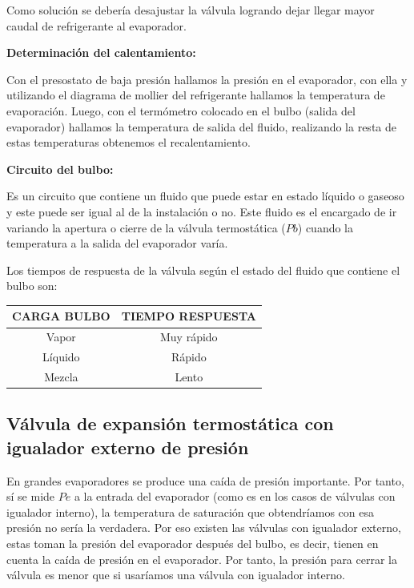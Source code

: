 Como soluci\'on se deber\'ia desajustar la v\'alvula logrando dejar llegar mayor caudal de refrigerante al evaporador.

\textbf{Determinaci\'on del calentamiento:}

Con el presostato de baja presi\'on hallamos la presi\'on en el evaporador, con ella y utilizando el diagrama de mollier del refrigerante hallamos la temperatura de evaporaci\'on. Luego, con el term\'ometro colocado en el bulbo (salida del evaporador) hallamos la temperatura de salida del fluido, realizando la resta de estas temperaturas obtenemos el recalentamiento. 

\textbf{Circuito del bulbo:}

Es un circuito que contiene un fluido que puede estar en estado l\'iquido o gaseoso y este puede ser igual al de la instalaci\'on o no. Este fluido es el encargado de ir variando la apertura o cierre de la v\'alvula termost\'atica ($Pb$) cuando la temperatura a la salida del evaporador var\'ia. 

Los tiempos de respuesta de la v\'alvula seg\'un el estado del fluido que contiene el bulbo son:

\begin{table}[H]
    \centering
    \begin{tabular}{c c}\hline
    CARGA BULBO & TIEMPO RESPUESTA\\ \hline
    Vapor & Muy r\'apido\\
    L\'iquido & R\'apido\\
    Mezcla & Lento\\ \hline    
    \end{tabular}
\end{table}

\subsection{V\'alvula de expansi\'on termost\'atica con igualador externo de presi\'on}

En grandes evaporadores se produce una ca\'ida de presi\'on importante. Por tanto, s\'i se mide $Pe$ a la entrada del evaporador (como es en los casos de v\'alvulas con igualador interno), la temperatura de saturaci\'on que obtendr\'iamos con esa presi\'on no ser\'ia la verdadera. Por eso existen las v\'alvulas con igualador externo, estas toman la presi\'on del evaporador despu\'es del bulbo, es decir, tienen en cuenta la ca\'ida de presi\'on en el evaporador. Por tanto, la presi\'on para cerrar la v\'alvula es menor que si usar\'iamos una v\'alvula con igualador interno.


